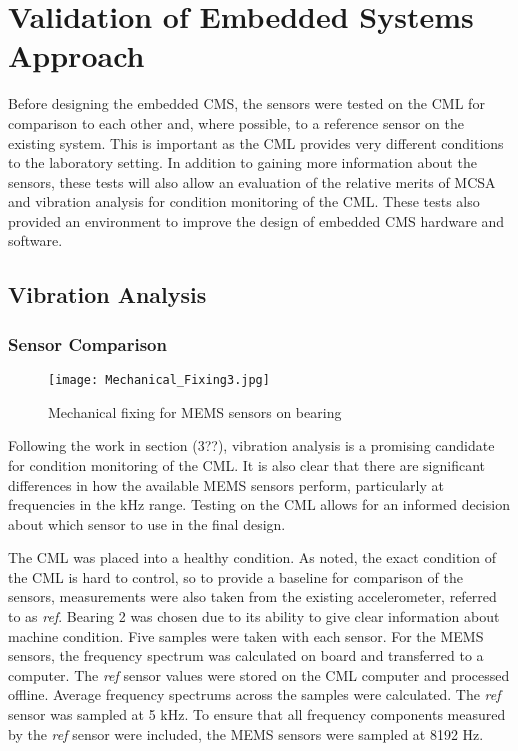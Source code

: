 \chapter{Validation of Embedded Systems Approach}

Before designing the embedded CMS, the sensors were tested on the CML for comparison to each other and, where possible, to a reference sensor on the existing system.
This is important as the CML provides very different conditions to the laboratory setting.
In addition to gaining more information about the sensors, these tests will also allow an evaluation of the relative merits of MCSA and vibration analysis for condition monitoring of the CML.
These tests also provided an environment to improve the design of embedded CMS hardware and software.
\par

\section{Vibration Analysis}

\subsection{Sensor Comparison}

\begin{figure}
    \centering
    \texttt{[image: Mechanical\_Fixing3.jpg]}
    \caption{Mechanical fixing for MEMS sensors on bearing}
    \label{fig:Mechanical_Fixing}
\end{figure}

Following the work in section (3??), vibration analysis is a promising candidate for condition monitoring of the CML.
It is also clear that there are significant differences in how the available MEMS sensors perform, particularly at frequencies in the kHz range.
Testing on the CML allows for an informed decision about which sensor to use in the final design.
\par

The CML was placed into a healthy condition.
As noted, the exact condition of the CML is hard to control, so to provide a baseline for comparison of the sensors, measurements were also taken from the existing accelerometer, referred to as \textit{ref}.
Bearing 2 was chosen due to its ability to give clear information about machine condition.
Five samples were taken with each sensor.
For the MEMS sensors, the frequency spectrum was calculated on board and transferred to a computer.
The \textit{ref} sensor values were stored on the CML computer and processed offline.
Average frequency spectrums across the samples were calculated.
The \textit{ref} sensor was sampled at 5 kHz.
To ensure that all frequency components measured by the \textit{ref} sensor were included, the MEMS sensors were sampled at 8192 Hz.
\par

